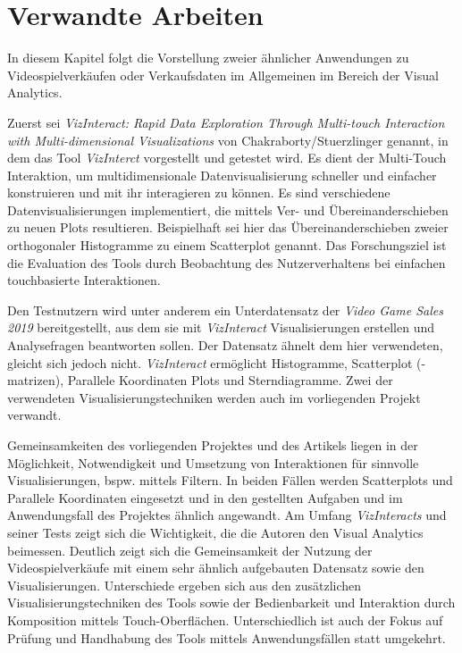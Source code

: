\documentclass[usegeometry=true]{scrartcl}
\begin{document}
\section{Verwandte Arbeiten}
In diesem Kapitel folgt die Vorstellung zweier ähnlicher Anwendungen zu Videospielverkäufen oder Verkaufsdaten im Allgemeinen im Bereich der Visual Analytics. 

Zuerst sei \textit{VizInteract: Rapid Data Exploration Through Multi-touch Interaction with Multi-dimensional Visualizations} von Chakraborty/Stuerzlinger genannt, 
in dem das Tool \textit{VizInterct} vorgestellt und getestet wird.\cite{Chakraborty.2021}
Es dient der Multi-Touch Interaktion, um multidimensionale Datenvisualisierung schneller und einfacher konstruieren und mit ihr interagieren zu können.
Es sind verschiedene Datenvisualisierungen implementiert, die mittels Ver- und Übereinanderschieben zu neuen Plots resultieren.
Beispielhaft sei hier das Übereinanderschieben zweier orthogonaler Histogramme zu einem Scatterplot genannt. 
Das Forschungsziel ist die Evaluation des Tools durch Beobachtung des Nutzerverhaltens bei einfachen touchbasierte Interaktionen.

Den Testnutzern wird unter anderem ein Unterdatensatz der \textit{Video Game Sales 2019} bereitgestellt, 
aus dem sie mit \textit{VizInteract} Visualisierungen erstellen und Analysefragen beantworten sollen.
Der Datensatz ähnelt dem hier verwendeten, gleicht sich jedoch nicht. 
\textit{VizInteract} ermöglicht Histogramme, Scatterplot (-matrizen), Parallele Koordinaten Plots und Sterndiagramme. 
Zwei der verwendeten Visualisierungstechniken werden auch im vorliegenden Projekt verwandt. 

Gemeinsamkeiten des vorliegenden Projektes und des Artikels liegen in der Möglichkeit, Notwendigkeit und 
Umsetzung von Interaktionen für sinnvolle Visualisierungen, bspw. mittels Filtern.
In beiden Fällen werden Scatterplots und Parallele Koordinaten eingesetzt und in den gestellten Aufgaben und 
im Anwendungsfall des Projektes ähnlich angewandt. 
Am Umfang \textit{VizInteracts} und seiner Tests zeigt sich die Wichtigkeit, die die Autoren den Visual Analytics beimessen.
Deutlich zeigt sich die Gemeinsamkeit der Nutzung der Videospielverkäufe mit einem sehr ähnlich aufgebauten Datensatz sowie den Visualisierungen.
Unterschiede ergeben sich aus den zusätzlichen Visualisierungstechniken des Tools sowie der Bedienbarkeit und Interaktion durch Komposition mittels Touch-Oberflächen. 
Unterschiedlich ist auch der Fokus auf Prüfung und Handhabung des Tools mittels Anwendungsfällen statt umgekehrt.
\end{document}
